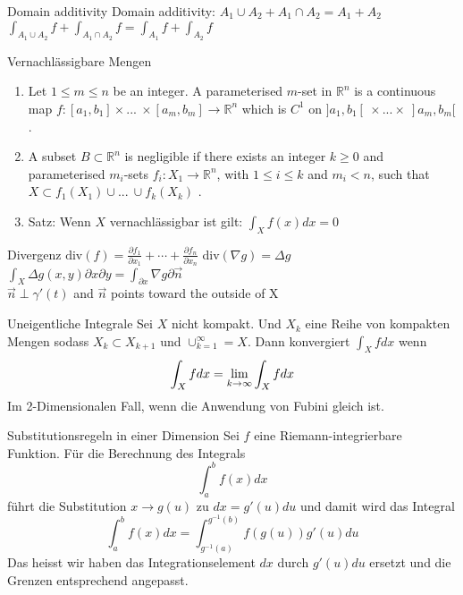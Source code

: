 \begin{Rechenregeln}{Domain additivity}
    Domain additivity: $A_1 \cup A_2 + A_1 \cap A_2 = A_1 + A_2$\\
    $\int_{A_1 \cup A_2} f + \int_{A_1 \cap A_2} f = \int_{A_1} f + \int_{A_2} f$
\end{Rechenregeln}

\begin{Definition}{Vernachlässigbare Mengen}{}
    \begin{enumerate}
        \def\labelenumi{\arabic{enumi}.}
        \item
          Let \(1\leq m \leq n\) be an integer. A parameterised \(m\)-set in
          \(\mathbb{R}^n\) is a continuous map
          \(f:[a_1,b_1]\times ...\ \times[a_m,b_m] \rightarrow \mathbb{R}^n\)
          which is \(C^1\) on \(]a_1, b_1[\ \times ... \times\ ]a_m,b_m[\).
        \item
          A subset \(B\subset \mathbb{R}^n\) is negligible if there exists an
          integer \(k \geq 0\) and parameterised \(m_i\)-sets
          \(f_i:X_1 \rightarrow \mathbb{R}^n\), with \(1\leq i \leq k\) and
          \(m_i < n\), such that \(X\subset f_1(X_1) \cup ...\ \cup f_k(X_k)\) .
        \item Satz: Wenn $X$ vernachlässigbar ist gilt:
            $\int_X f(x) dx = 0$
    \end{enumerate}
\end{Definition}

\begin{Definition}{Divergenz}{}
    $\text{div}(f) = \frac{\partial f_1}{\partial x_1} + \cdots + \frac{\partial f_n}{\partial x_n}$ \quad div$(\nabla g) = \Delta g$ \quad $\int_X \Delta g (x,y) \partial x \partial y = \int_{\partial x} \nabla g \partial \Vec{n}$\\
    $\Vec{n} \perp \gamma'(t)$ and $\Vec{n}$ points toward the outside of X
\end{Definition}
\begin{Definition}{Uneigentliche Integrale}{}
    Sei $X$ nicht kompakt. Und $X_k$ eine Reihe von kompakten Mengen sodass $X_k \subset X_{k+1}$ und
    $\cup_{k = 1}^{\infty} = X$. Dann konvergiert $\int_X f dx$ wenn
    \[
        \int_X f dx = \lim\limits_{k \to \infty}{\int_X f dx}
    \]
    Im 2-Dimensionalen Fall, wenn die Anwendung von Fubini gleich ist.
\end{Definition}

\begin{Satz}{Substitutionsregeln in einer Dimension}{}
    Sei $f$ eine Riemann-integrierbare Funktion. Für die Berechnung des Integrals
    \[
        \int_a^b f(x) dx
    \]
    führt die Substitution $x \to g(u)$ zu $dx = g'(u)du$ und damit wird das Integral
    \[
        \int_a^b f(x) dx = \int_{g^{-1}(a)}^{g^{-1}(b)} f(g(u)) g'(u) du
    \]
    Das heisst wir haben das Integrationselement $dx$ durch $g'(u)du$ ersetzt und die Grenzen entsprechend angepasst.
\end{Satz}

